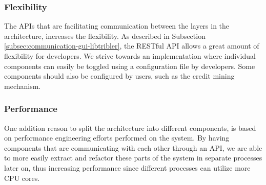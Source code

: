 \subsubsection{\textbf{Flexibility}}
The APIs that are facilitating communication between the layers in the architecture, increases the flexibility. As described in Subsection \ref{subsec:communication-gui-libtribler}, the RESTful API allows a great amount of flexibility for developers. We strive towards an implementation where individual components can easily be toggled using a configuration file by developers. Some components should also be configured by users, such as the credit mining mechanism.

\subsubsection{\textbf{Performance}}
One addition reason to split the architecture into different components, is based on performance engineering efforts performed on the system. By having components that are communicating with each other through an API, we are able to more easily extract and refactor these parts of the system in separate processes later on, thus increasing performance since different processes can utilize more CPU cores.